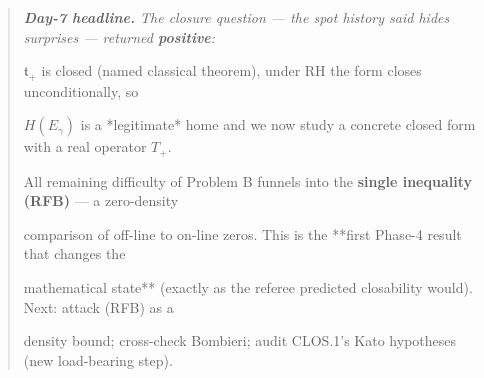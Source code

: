 \documentclass[10pt]{article}
\begin{document}
\begin{quote}\itshape
\textbf{Day-7 headline.} The closure question --- the spot history said hides surprises --- returned \textbf{positive}:\par
$\mathfrak t_+$ is closed (named classical theorem), under RH the form closes unconditionally, so\par
$H(E_\gamma)$ is a *legitimate* home and we now study a concrete closed form with a real operator $T_+$.\par
All remaining difficulty of Problem B funnels into the \textbf{single inequality (RFB)} --- a zero-density\par
comparison of off-line to on-line zeros. This is the **first Phase-4 result that changes the\par
mathematical state** (exactly as the referee predicted closability would). Next: attack (RFB) as a\par
density bound; cross-check Bombieri; audit CLOS.1's Kato hypotheses (new load-bearing step).\par
\end{quote}
\end{document}
